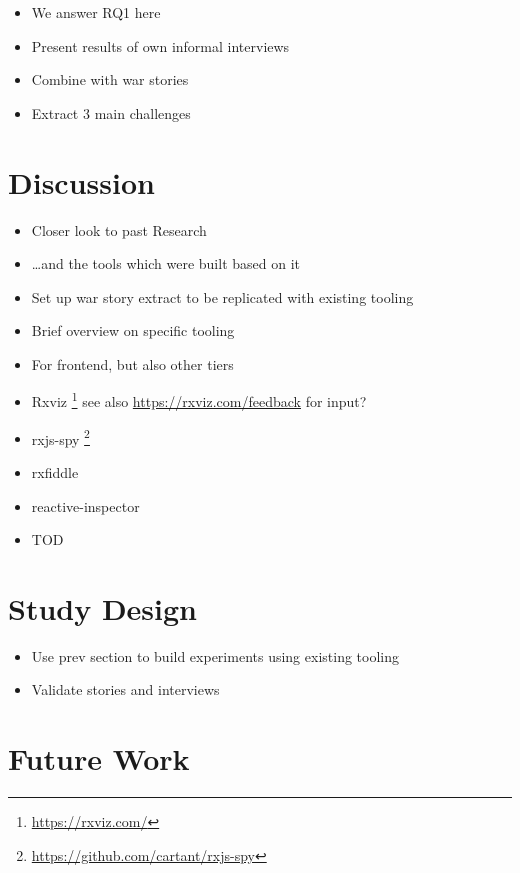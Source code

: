 \documentclass[12pt,a4paper]{article}
\begin{document}
\begin{itemize}
	\item We answer RQ1 here
	\item Present results of own informal interviews
	\item Combine with war stories
	\item Extract 3 main challenges
\end{itemize}

\section{Discussion}
\label{sec:discussion}

\begin{itemize}
	\item Closer look to past Research
	\item \dots and the tools which were built based on it
	\item Set up war story extract to be replicated with existing tooling
\end{itemize}

\begin{itemize}
	\item Brief overview on specific tooling
	\item For frontend, but also other tiers
	\item Rxviz \footnote{\url{https://rxviz.com/}} see also \url{https://rxviz.com/feedback} for input?
	\item rxjs-spy \footnote{\url{https://github.com/cartant/rxjs-spy}}
	\item rxfiddle \cite{10.1145/3180155.3180156}
	\item reactive-inspector \cite{10.1145/2884781.2884815}
	\item TOD \cite{5287015}
\end{itemize}


\section{Study Design}
\label{sec:study}

\begin{itemize}
	\item Use prev section to build experiments using existing tooling
	\item Validate stories and interviews
\end{itemize}

\section{Future Work}
\label{sec:future}
\end{document}
